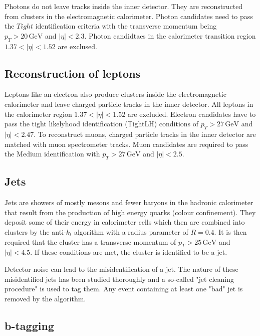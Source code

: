 Photons do not leave tracks inside the inner detector. They are reconstructed from clusters in the electromagnetic calorimeter. Photon candidates need to pass the $Tight$ identification criteria with the transverse momentum being $p_T >20\,\si{\giga\electronvolt}$ and $|\eta| < 2.3$. 
Photon candidtaes in the calorimeter transition region $1.37 < |\eta| < 1.52$ are exclused. 

\subsection{Reconstruction of leptons}
\label{sec:reconlepton}

Leptons like an electron also produce clusters inside the electromagnetic calorimeter and leave charged particle tracks in the inner detector. All leptons in the calorimeter region $1.37 < |\eta| < 1.52$ are excluded. Electron candidates have to pass the tight likelyhood identification (TightLH) conditions of $p_T > 27 \,\si{\giga\electronvolt}$ and $|\eta| < 2.47$. 
To reconstruct muons, charged particle tracks in the inner detector are matched with muon spectrometer tracks. Muon candidates are required to pass the Medium identification with $p_T > 27 \,\si{\giga\electronvolt}$ and $|\eta| < 2.5$.

\subsection{Jets}
\label{sec:jets}
Jets are showers of mostly mesons and fewer baryons in the hadronic calorimeter that result from the production of high energy quarks (colour confinement). They deposit some of their energy in calorimeter cells which then are combined into clusters by the anti-$k_t$ algorithm \cite{anti_k_t} with a radius parameter of $R = 0.4$. 
It is then required that the cluster has a transverse momentum of $p_T > 25 \,\si{\giga\electronvolt}$ and $\bigl|\eta\bigr| < 4.5$. If these conditions are met, the cluster is identified to be a jet.

Detector noise can lead to the misidentification of a jet. The nature of these misidentified jets has been studied thoroughly and a so-called "jet cleaning procedure" is used to tag them. 
Any event containing at least one "bad" jet is removed by the algorithm. 
\subsection{b-tagging}
\label{sec:btagging}

